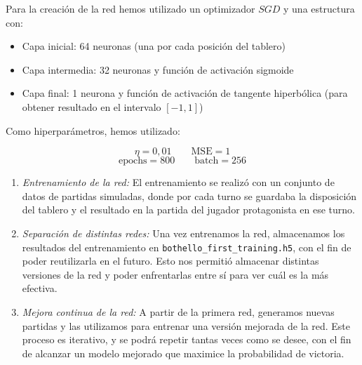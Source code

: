 \documentclass[conference,a4paper]{IEEEtran}
\begin{document}
\begin{enumerate}
  Para la creación de la red hemos utilizado un optimizador $SGD$ y una estructura con:
  \begin{itemize}
    \item Capa inicial: 64 neuronas (una por cada posición del tablero)
    \item Capa intermedia: 32 neuronas y función de activación sigmoide
    \item Capa final: 1 neurona y función de activación de tangente hiperbólica (para obtener resultado en el intervalo $[-1,1]$)
  \end{itemize}

  Como hiperparámetros, hemos utilizado:

  \begin{equation}
  \label{eq:tasaaprendizaje_mse}
   \eta = 0,01 \qquad \text{MSE} = 1
  \end{equation}
  \begin{equation}
  \label{eq:epochs_bach}
   \text{epochs} = 800  \qquad \text{batch} = 256
  \end{equation}

  \begin{enumerate}
  \item \textit{Entrenamiento de la red:} El entrenamiento se realizó con un conjunto de datos de partidas
  simuladas, donde por cada turno se guardaba la disposición del tablero y el resultado en la partida del 
  jugador protagonista en ese turno.
  \item \textit{Separación de distintas redes:} Una vez entrenamos la red, almacenamos los resultados del entrenamiento en 
  \texttt{bothello\_first\_training.h5}, con el fin de poder reutilizarla en el futuro. Esto nos
  permitió almacenar distintas versiones de la red y poder enfrentarlas entre sí para ver cuál es la más efectiva.
  \item \textit{Mejora continua de la red:} A partir de la primera red, generamos nuevas partidas y las utilizamos para
  entrenar una versión mejorada de la red. Este proceso es iterativo, y se podrá repetir tantas veces como se desee,
  con el fin de alcanzar un modelo mejorado que maximice la probabilidad de victoria.
  \end{enumerate}
  
\end{enumerate}
\end{document}
